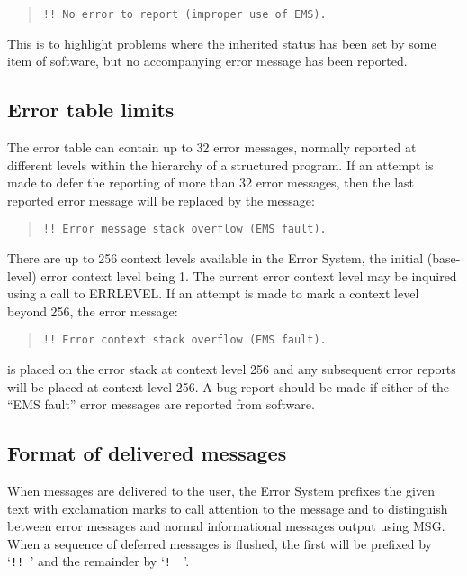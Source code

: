 \documentclass[twoside,11pt]{article}
\newcommand{\xlabel}[1]{}
\renewcommand{\_}{\texttt{\symbol{95}}}
\begin{document}
\begin {quote}
\begin {small}
\begin{verbatim}
!! No error to report (improper use of EMS).
\end{verbatim}
\end {small}
\end {quote}

This is to highlight problems where the inherited status has been set by 
some item of software, but no accompanying error message has been reported. 

\subsection{\xlabel{error_table_limits}Error table limits}
The error table can contain up to 32 error messages, normally reported at
different levels within the hierarchy of a structured program. 
If an attempt is made to defer the reporting of more than 32 error messages, 
then the last reported error message will be replaced by the message:

\begin{quote}
\begin {small}
\begin{verbatim}
!! Error message stack overflow (EMS fault).
\end{verbatim}
\end {small}
\end{quote}

There are up to 256 context levels available in the Error System, the 
initial (base-level) error context level being 1.
The current error context level may be inquired using a call to ERR\_LEVEL.
If an attempt is made to mark a context level beyond 256, the error message:
\begin{quote}
\begin {small}
\begin{verbatim}
!! Error context stack overflow (EMS fault).
\end{verbatim}
\end {small}
\end{quote}
is placed on the error stack at context level 256 and any subsequent error
reports will be placed at context level 256.
A bug report should be made if either of the ``EMS fault'' error messages are
reported from software.


\subsection{\xlabel{format_of_delivered_messages}Format of delivered messages \label{excl_sect}}
When messages are delivered to the user, the Error System prefixes the given
text with exclamation marks to call attention to the message and to 
distinguish between error messages and normal informational messages output 
using MSG.
When a sequence of deferred messages is flushed, the first will be prefixed
by `\texttt{!!\ }' and the remainder by `\texttt{!\ \ }'. 
\end{document}

